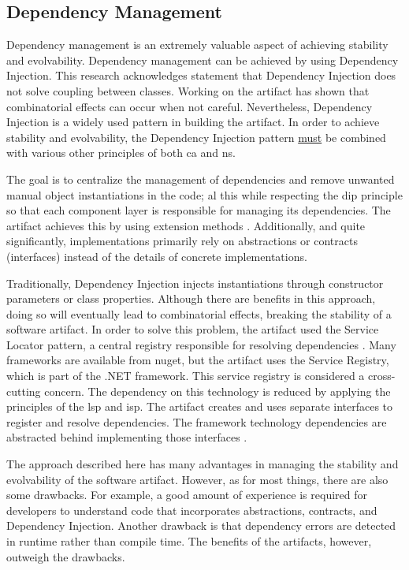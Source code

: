 \subsection{Dependency Management}

Dependency management is an extremely valuable aspect of achieving stability and
evolvability. Dependency management can be achieved by using Dependency Injection. This
research acknowledges \textcite[215]{mannaert_normalized_2016} statement that Dependency
Injection does not solve coupling between classes. Working on the artifact has shown that
combinatorial effects can occur when not careful. Nevertheless, Dependency Injection is a
widely used pattern in building the artifact. In order to achieve stability and
evolvability, the Dependency Injection pattern \underline{must} be combined with various
other principles of both \gls{ca} and \gls{ns}. 

The goal is to centralize the management of dependencies and remove unwanted manual object
instantiations in the code; al this while respecting the \gls{dip} principle so that each
component layer is responsible for managing its dependencies. The artifact achieves this
by using extension methods \parencite{koks_dependencyinjectionextension_2023}. Additionally, and quite significantly,
implementations primarily rely on abstractions or contracts (interfaces) instead of the
details of concrete implementations. 

Traditionally, Dependency Injection injects instantiations through constructor parameters
or class properties. Although there are benefits in this approach, doing so will
eventually lead to combinatorial effects, breaking the stability of a software artifact.
In order to solve this problem, the artifact used the Service Locator pattern, a central
registry responsible for resolving dependencies \parencite{wikipedia_service_2023}. Many 
frameworks are available from \gls{nuget}, but the artifact uses the Service Registry,
which is part of the .NET framework. This service registry is considered a cross-cutting
concern. The dependency on this technology is reduced by applying the principles of the
\gls{lsp} and \gls{isp}. The artifact creates and uses separate interfaces to register
\parencite{koks_idependencymanagerinteractor_2023} and resolve
\parencite{koks_idependencyfactoryinteractor_2023} dependencies. The framework technology
dependencies are abstracted behind implementing those interfaces
\parencite{koks_dependencymanagerinteractor_2023}. 

The approach described here has many advantages in managing the stability and evolvability
of the software artifact. However, as for most things, there are also some drawbacks. For
example, a good amount of experience is required for developers to understand code that
incorporates abstractions, contracts, and Dependency Injection. Another drawback is that
dependency errors are detected in runtime rather than compile time. The benefits of the
artifacts, however, outweigh the drawbacks.